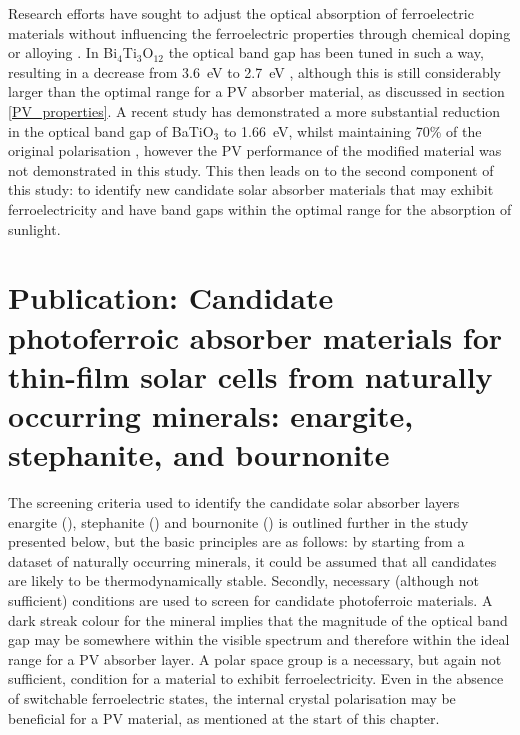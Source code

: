 \documentclass[11pt, twoside]{report}
\begin{document}
Research efforts have sought to adjust the optical absorption of ferroelectric materials without influencing the ferroelectric properties through chemical doping or alloying \cite{FE_PV_rev1}. In Bi$_4$Ti$_3$O$_{12}$ the optical band gap has been tuned in such a way, resulting in a decrease from \SI{3.6}{eV} to \SI{2.7}{eV} \cite{FE_PV_rev1_83}, although this is still considerably larger than the optimal range for a PV absorber material, as discussed in section \ref{PV_properties}. A recent study has demonstrated a more substantial reduction in the optical band gap of BaTiO$_3$  to \SI{1.66}{eV}, whilst maintaining 70\% of the original polarisation \cite{FE-PV_lett}, however the PV performance of the modified material was not demonstrated in this study. 
This then leads on to the second component of this study: to identify new candidate solar absorber materials that may exhibit ferroelectricity and have band gaps within the optimal range for the absorption of sunlight. 

\section{Publication: Candidate photoferroic absorber materials for thin-film
solar cells from naturally occurring minerals:
enargite, stephanite, and bournonite}\label{sulfosalts1}


The screening criteria used to identify the candidate solar absorber layers enargite ({\enargite}), stephanite ({\stephanite}) and bournonite ({\bournonite}) is outlined further in the study presented below, but the basic principles are as follows: by starting from a dataset of naturally occurring minerals, it could be assumed that all candidates are likely to be thermodynamically stable. Secondly, necessary (although not sufficient) conditions are used to screen for candidate photoferroic materials. A dark streak colour for the mineral implies that the magnitude of the optical band gap may be somewhere within the visible spectrum and therefore within the ideal range for a PV absorber layer. A polar space group is a necessary, but again not sufficient, condition for a material to exhibit ferroelectricity. Even in the absence of switchable ferroelectric states, the internal crystal polarisation may be beneficial for a PV material, as mentioned at the start of this chapter.
\end{document}
